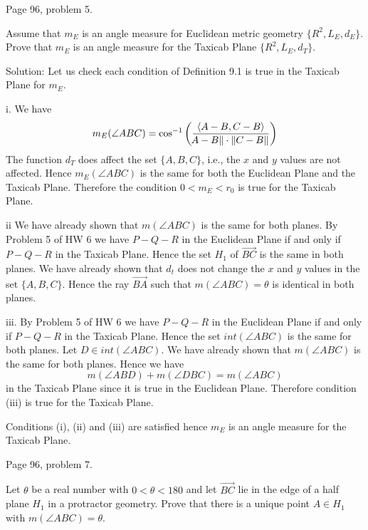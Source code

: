 \vfill
\eject

\beginsection Page 96, problem 5.

Assume that $m_E$ is an angle measure for Euclidean metric geometry $\{R^2,L_E,d_E\}$.
Prove that $m_E$ is an angle measure for the Taxicab Plane $\{R^2,L_E,d_T\}$.

\bigskip
\noindent
Solution: Let us check each condition of Definition 9.1 is true in the Taxicab Plane for $m_E$.

\medskip
\item{i.} We have
$$m_E(\angle ABC)=\cos^{-1}\left({\langle A-B,C-B\rangle\over\!A-B\|\cdot\|C-B\|}\right)$$
The function $d_T$ does affect the set $\{A,B,C\}$, i.e., the $x$ and $y$ values are not affected.
Hence $m_E(\angle ABC)$ is the same for both the Euclidean Plane and the Taxicab Plane.
Therefore the condition $0<m_E<r_0$ is true for the Taxicab Plane.

\medskip
\item{ii}
We have already shown that $m(\angle ABC)$ is the same for both planes.
By Problem 5 of HW 6 we have $P{-}Q{-}R$ in the Euclidean Plane if and only if $P{-}Q{-}R$
in the Taxicab Plane.
Hence the set $H_1$ of $\overrightarrow{BC}$ is the same in both planes.
We have already shown that $d_t$ does not change the $x$ and $y$ values in the set $\{A,B,C\}$.
Hence the ray $\overrightarrow{BA}$ such that
$m(\angle ABC)=\theta$ is identical in both planes.

\medskip
\item{iii.}
By Problem 5 of HW 6 we have $P{-}Q{-}R$ in the Euclidean Plane if and only if $P{-}Q{-}R$
in the Taxicab Plane.
Hence the set $int(\angle ABC)$ is the same for both planes.
Let $D\in int(\angle ABC)$.
We have already shown that $m(\angle ABC)$ is the same for both planes.
Hence we have
$$m(\angle ABD)+m(\angle DBC)=m(\angle ABC)$$
in the Taxicab Plane since it is true in the Euclidean Plane.
Therefore condition (iii) is true for the Taxicab Plane.

\medskip
\noindent
Conditions (i), (ii) and (iii) are satisfied hence $m_E$ is an angle measure for the
Taxicab Plane.

\vfill
\eject

\beginsection Page 96, problem 7.

Let $\theta$ be a real number with $0<\theta<180$ and let $\overrightarrow{BC}$
lie in the edge of a half plane $H_1$ in a protractor geometry.
Prove that there is a unique point $A\in H_1$ with $m(\angle ABC)=\theta$.


